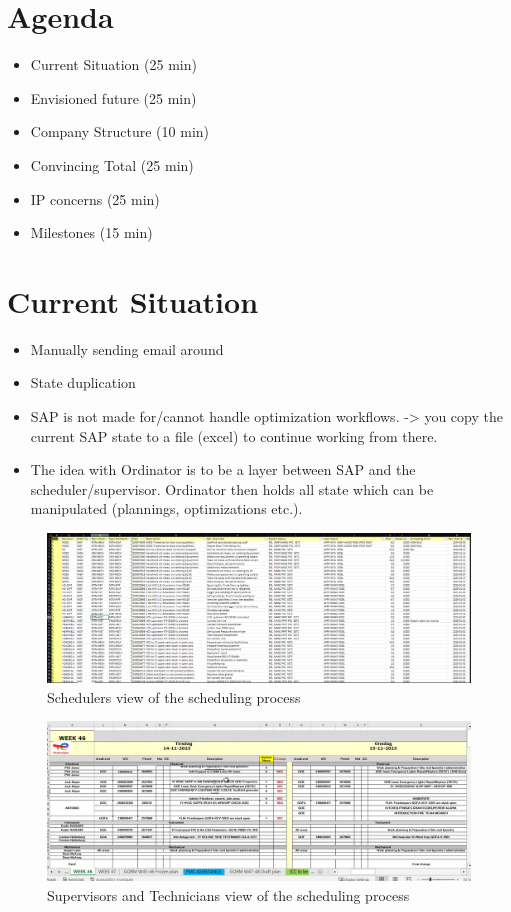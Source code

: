 \documentclass{article}
\begin{document}
\section{Agenda}
\begin{itemize}
	\item Current Situation    (25 min)
    \item Envisioned future    (25 min)
    \item Company Structure    (10 min)
    \item Convincing Total     (25 min)	
    \item IP concerns          (25 min)
    \item Milestones           (15 min)
\end{itemize}

\section{Current Situation}


\begin{itemize}
    \item Manually sending email around
    \item State duplication
    \item SAP is not made for/cannot handle optimization workflows. -> you copy the current SAP state to a file (excel) to continue working from there.
    \item The idea with Ordinator is to be a layer between SAP and the scheduler/supervisor. Ordinator then holds all state which can be manipulated (plannings, optimizations etc.).
\end{itemize}



\begin{figure}[H]
\includegraphics[width=1.0\textwidth]{../../project-plans/scipo-total/figures/schedulers-view-into-the-scheduling-process.png}
\caption{Schedulers view of the scheduling process}
\end{figure}
\begin{figure}[H]
\includegraphics[width=1.0\textwidth]{../../project-plans/scipo-total/figures/technician-excel.png}
\caption{Supervisors and Technicians view of the scheduling process}
\end{figure}
\end{document}
